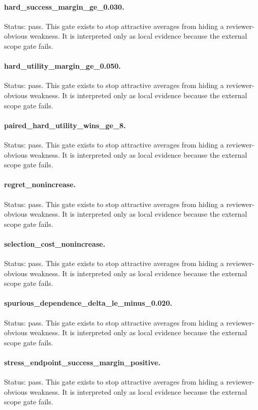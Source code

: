 \documentclass{article}
\begin{document}
\paragraph{hard\_success\_margin\_ge\_0.030.} Status: pass. This gate exists to stop attractive averages from hiding a reviewer-obvious weakness. It is interpreted only as local evidence because the external scope gate fails.
\paragraph{hard\_utility\_margin\_ge\_0.050.} Status: pass. This gate exists to stop attractive averages from hiding a reviewer-obvious weakness. It is interpreted only as local evidence because the external scope gate fails.
\paragraph{paired\_hard\_utility\_wins\_ge\_8.} Status: pass. This gate exists to stop attractive averages from hiding a reviewer-obvious weakness. It is interpreted only as local evidence because the external scope gate fails.
\paragraph{regret\_nonincrease.} Status: pass. This gate exists to stop attractive averages from hiding a reviewer-obvious weakness. It is interpreted only as local evidence because the external scope gate fails.
\paragraph{selection\_cost\_nonincrease.} Status: pass. This gate exists to stop attractive averages from hiding a reviewer-obvious weakness. It is interpreted only as local evidence because the external scope gate fails.
\paragraph{spurious\_dependence\_delta\_le\_minus\_0.020.} Status: pass. This gate exists to stop attractive averages from hiding a reviewer-obvious weakness. It is interpreted only as local evidence because the external scope gate fails.
\paragraph{stress\_endpoint\_success\_margin\_positive.} Status: pass. This gate exists to stop attractive averages from hiding a reviewer-obvious weakness. It is interpreted only as local evidence because the external scope gate fails.
\end{document}
